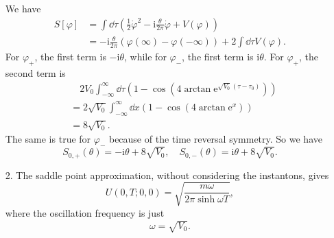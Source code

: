 \documentclass[hyperref, a4paper]{article}
\newcommand*{\ii}{\mathrm{i}}
\newcommand*{\ee}{\mathrm{e}}
\begin{document}
\begin{itemize}
We have 
\[
    \begin{aligned}
        S[\varphi] &= \int \dd{\tau} \left( \frac{1}{2} \dot{\varphi}^2 
        - \ii \frac{\theta}{2\pi} \dot{\varphi}
        + V(\varphi) \right) \\
        &= - \ii \frac{\theta}{2\pi} (\varphi(\infty) - \varphi(-\infty)) + 
        2 \int \dd{\tau} V(\varphi).
    \end{aligned}
\]
For $\varphi_+$, the first term is $- \ii \theta$, 
while for $\varphi_-$, the first term is $\ii \theta$.
For $\varphi_+$, the second term is 
\[
    \begin{aligned}
        &\quad 2 V_0 \int^\infty_{-\infty} \dd{\tau} \left( 
            1 - \cos(4 \arctan \ee^{\sqrt{V_0} (\tau - \tau_0)})
        \right) \\
        &= 2 \sqrt{V_0} \int_{-\infty}^\infty \dd{x}  \left( 
            1 - \cos(4 \arctan \ee^{x})
        \right) \\
        &= 8 \sqrt{V_0}.
    \end{aligned}
\]
The same is true for $\varphi_{-}$ because of the time reversal symmetry.
So we have 
\begin{equation}
    S_{0, +}(\theta) = - \ii \theta + 8 \sqrt{V_0}, \quad 
    S_{0, -}(\theta) =   \ii \theta + 8 \sqrt{V_0}.
    \label{eq:single-instanton}
\end{equation}

\item[2.] The saddle point approximation, without considering the instantons, gives 
\begin{equation}
    U(0, T; 0, 0) = \sqrt{\frac{m \omega}{2 \pi \sinh \omega T}},
\end{equation}
where the oscillation frequency is just 
\begin{equation}
    \omega = \sqrt{V_0}.
\end{equation}


\end{itemize}
\end{document}
